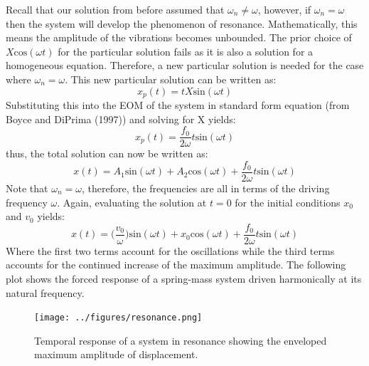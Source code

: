 \documentclass[12pt,letter]{article}
\numberwithin{ex}{section} %
\numberwithin{re}{section} %
\numberwithin{pr}{section} %
\begin{document}
			Recall that our solution from before assumed that $\omega_n \neq \omega$, however, if $\omega_n = \omega$ then the system will develop the phenomenon of resonance. Mathematically, this means the amplitude of the vibrations becomes unbounded. The prior choice of $X\text{cos}(\omega t)$ for the particular solution fails as it is also a solution for a homogeneous equation. Therefore, a new particular solution is needed for the case where $\omega_n = \omega$. This new particular solution can be written as:
			\begin{equation}
				x_p(t) = t X\text{sin}(\omega t)
			\end{equation}				
			Substituting this into the EOM of the system in standard form equation (from Boyce and DiPrima (1997)) and solving for X yields:
			\begin{equation}
				x_p(t) = \frac{f_0}{2 \omega} t \text{sin}(\omega t)
			\end{equation}	
			thus, the total solution can now be written as:
			\begin{equation}
				x(t) = A_1\text{sin}(\omega t) + A_2\text{cos}(\omega t) + \frac{f_0}{2 \omega} t \text{sin}(\omega t)
			\end{equation}			
			Note that $\omega_n=\omega$, therefore, the frequencies are all in terms of the driving frequency $\omega$. Again, evaluating the solution at $t=0$ for the initial conditions $x_0$ and $v_0$ yields:
			\begin{equation}
				x(t) = \Big(\frac{v_0}{\omega}\Big)\text{sin}(\omega t) + x_0\text{cos}(\omega t) + \frac{f_0}{2 \omega} t \text{sin}(\omega t)
			\end{equation}			
			Where the first two terms account for the oscillations while the third terms accounts for the continued increase of the maximum amplitude. The following plot shows the forced response of a spring-mass system driven harmonically at its natural frequency.
			\begin{figure}[H]
				\centering
				\texttt{[image: ../figures/resonance.png]}
				\caption{Temporal response of a system in resonance showing the enveloped maximum amplitude of displacement.}
			\end{figure}				
\end{document}
